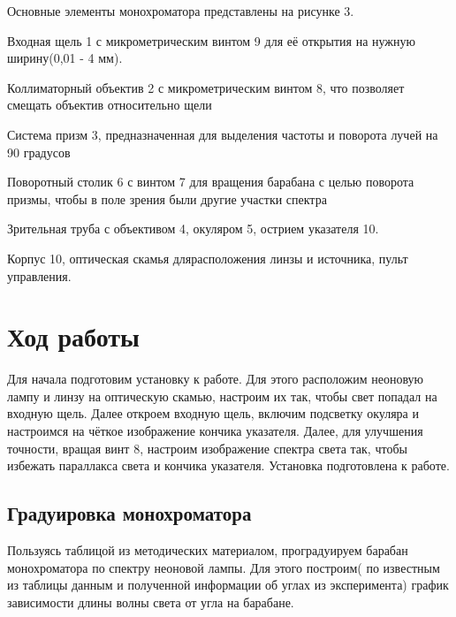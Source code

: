 \documentclass[a4paper,12pt]{article}
\begin{document}
Основные элементы монохроматора представлены на рисунке 3.

Входная щель 1 с микрометрическим винтом 9 для её открытия на нужную ширину(0,01 - 4 мм).

Коллиматорный объектив 2 с микрометрическим винтом 8, что позволяет смещать объектив относительно щели

Система призм 3, предназначенная для выделения частоты и поворота лучей на 90 градусов

Поворотный столик 6 с винтом 7 для вращения барабана с целью поворота призмы, чтобы в поле зрения были другие участки спектра

Зрительная труба с объективом 4, окуляром 5, острием указателя 10. 

Корпус 10, оптическая скамья длярасположения линзы и источника, пульт управления.

\section{Ход работы}
Для начала подготовим установку к работе. Для этого расположим неоновую лампу и линзу на оптическую скамью, настроим их так, чтобы свет попадал на входную щель. Далее откроем входную щель, включим подсветку окуляра и настроимся на чёткое изображение кончика указателя. Далее, для улучшения точности, вращая винт 8, настроим изображение спектра света так, чтобы избежать параллакса света и кончика указателя. Установка подготовлена к работе.

\subsection*{Градуировка монохроматора}
Пользуясь таблицой из методических материалом, проградуируем барабан монохроматора по спектру неоновой лампы. Для этого построим( по известным из таблицы данным и полученной информации об углах из эксперимента) график зависимости длины волны света от угла на барабане.
\end{document}
